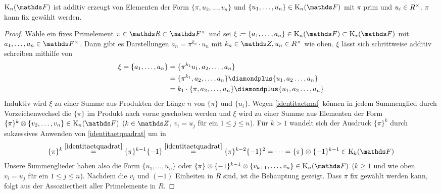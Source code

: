 \documentclass[ngerman,fontsize=11pt, paper=a4, parskip=half, titlepage=true, toc=bib]{scrartcl}
\begin{document}
\begin{Lem}\label{darstellungknf}
  $\KnF$ ist additiv erzeugt von Elementen der Form 
  $\{\pi, u_{2},\dotsc,v_n\}$
  und $\{u_{1},\dotsc,u_n\}\in\KnF$ mit $\pi$ prim und
  $u_i\in R^\times$.
  $\pi$ kann fix gewählt werden.
  \begin{proof}
    Wähle ein fixes Primelement $\pi\in\R\subset\Fx$
    und sei $\xi\coloneqq\{a_1,\dotsc, a_n\}\in\KnF\subset\KF$ mit
    $a_1,\dotsc,a_n\in\Fx$. Dann gibt es Darstellungen
    $a_n=\pi^{k_n}\cdot u_n$ mit $k_n\in\Z,u_n\in \Rx$ wie
    oben. $\xi$ lässt sich schrittweise additiv schreiben mithilfe
    von
    \begin{align*}
      \xi=\{a_1,\dotsc,a_n\}
      &=\{\pi^{k_1}u_1, a_2, \dotsc, a_n\}\\
      &=\{\pi^{k_1}, a_2, \dotsc, a_n\}
        \p\{u_1, a_2 \dotsc, a_n\}\\
      &=k_1\cdot \{\pi,a_2, \dotsc, a_n\}
        \p\{u_1, a_2 \dotsc, a_n\}
    \end{align*}
    Induktiv wird $\xi$ zu einer Summe aus Produkten der Länge $n$ von
    $\{\pi\}$ und $\{u_i\}$.
    Wegen \ref{identitaetmal} können in jedem Summenglied durch
    Vorzeichenwechsel die $\{\pi\}$ im Produkt nach vorne geschoben werden
    und $\xi$ wird zu einer Summe aus Elementen der Form
    $\{\pi\}^k\otimes\{v_{2},\dotsc,v_n\}\in\KnF$ 
    ($k\in\Z$, $v_i=u_j$ für ein $1\leq j\leq n$).
    Für $k>1$ wandelt sich der Ausdruck $\{\pi\}^k$ durch
    sukzessives Anwenden von \ref{identitaetquadrat} um in
    \begin{gather*}
      \{\pi\}^k
      \overset{\ref{identitaetquadrat}}{=} \{\pi\}^{k-1}\{-1\}
      \overset{\ref{identitaetquadrat}}{=} \{\pi\}^{k-2}\{-1\}^2
      =\dotsb=\{\pi\}\otimes\{-1\}^{k-1} \in\K_{k}(\F)
    \end{gather*}
    Unsere Summenglieder haben also die Form $\{u_1,\dotsc, u_n\}$ oder
    $\{\pi\}\otimes\{-1\}^{k-1}\otimes\{v_{k+1},\dotsc,v_n\}\in\KnF$
    ($k\geq 1$ und wie oben $v_i=u_j$ für ein $1\leq j\leq n$).
    Nachdem die $v_i$ und $(-1)$ Einheiten in $R$ sind,
    ist die Behauptung gezeigt.
    Dass $\pi$ fix gewählt werden kann, folgt aus der Assoziiertheit
    aller Primelemente in $R$.
  \end{proof}
\end{Lem}

\end{document}
